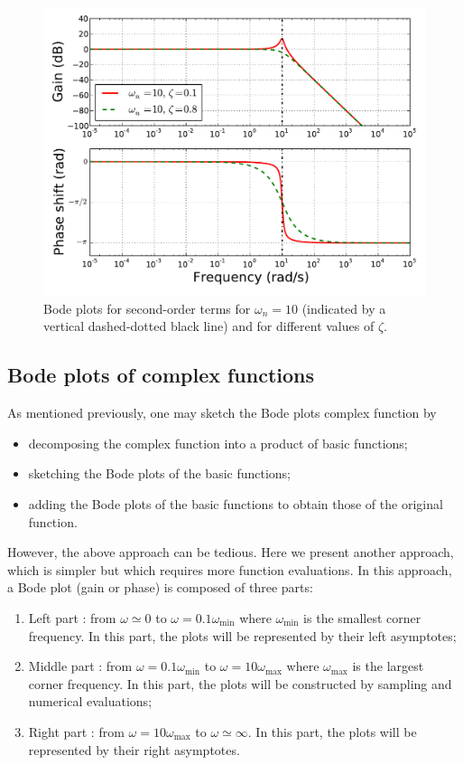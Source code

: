 \documentclass[a4paper,11pt]{report}
\theoremstyle{definition}
\begin{document}
\begin{figure}[H]
  \centering
  \includegraphics[width=12cm]{fig/bode-second.pdf}
  \caption{Bode plots for second-order terms for $\omega_n=10$
    (indicated by a vertical dashed-dotted black line) and for
    different values of $\zeta$.}
  \label{fig:bode-2nd}
\end{figure}

\subsection{Bode plots of complex functions}
\label{sec:bode-complex}

As mentioned previously, one may sketch the Bode plots complex
function by
\begin{itemize}
\item decomposing the complex function into a product of basic functions;
\item sketching the Bode plots of the basic functions;
\item adding the Bode plots of the basic functions to obtain those of the
  original function.
\end{itemize}

However, the above approach can be tedious. Here we present another
approach, which is simpler but which requires more function
evaluations. In this approach, a Bode plot (gain or phase) is composed
of three parts:
\begin{enumerate}
\item Left part : from $\omega \simeq 0$ to
  $\omega=0.1\omega_{\min}$ where $\omega_{\min}$ is the smallest
  corner frequency. In this part, the plots will be represented by their
  left asymptotes;
\item Middle part : from $\omega=0.1\omega_{\min}$ to
  $\omega=10\omega_{\max}$ where $\omega_{\max}$ is the largest corner
  frequency. In this part, the plots will be constructed by sampling
  and numerical evaluations;
\item Right part : from $\omega=10\omega_{\max}$ to
  $\omega\simeq\infty$. In this part, the plots will be represented by
  their right asymptotes.
\end{enumerate}
\end{document}
